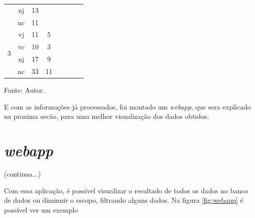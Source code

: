 \begin{table}[H]
{\begin{tabular}{@{}|c|c|c|c|c|c|c|c|c|c|c|c|c|c|@{}}
                               & nj            & \multicolumn{4}{c|}{13}                & \multicolumn{4}{c|}{}                                                               &                     &                     &                     &                     \\ \cmidrule(lr){2-6}
                               & nc            & \multicolumn{4}{c|}{11}                & \multicolumn{4}{c|}{}                                                               &                     &                     &                     &                     \\ \midrule
\multirow{4}{*}{3}             & vj            & \multicolumn{4}{c|}{11}                & \multicolumn{4}{c|}{5}                                                              & \multicolumn{4}{c|}{\multirow{4}{*}{}}                                                \\ \cmidrule(lr){2-10}
                               & vc            & \multicolumn{4}{c|}{10}                & \multicolumn{4}{c|}{3}                                                              & \multicolumn{4}{c|}{}                                                                 \\ \cmidrule(lr){2-10}
                               & nj            & \multicolumn{4}{c|}{17}                & \multicolumn{4}{c|}{9}                                                              & \multicolumn{4}{c|}{}                                                                 \\ \cmidrule(lr){2-10}
                               & nc            & \multicolumn{4}{c|}{33}                & \multicolumn{4}{c|}{11}                                                             & \multicolumn{4}{c|}{}                                                                 \\ \bottomrule
\end{tabular}%
}
\small{Fonte: Autor.}
\end{table}

E com as informações já processados, foi montado um \textit{webapp}, que sera explicado na proxima secão, para uma melhor visualização dos dados obtidos.

\section{\textit{webapp}}

(continua...)

Com essa aplicação, é possível visualizar o resultado de todos os dados no banco de dados ou diminuir o escopo, filtrando alguns dados. Na figura \ref{fig:webapp} é possível ver um exemplo


